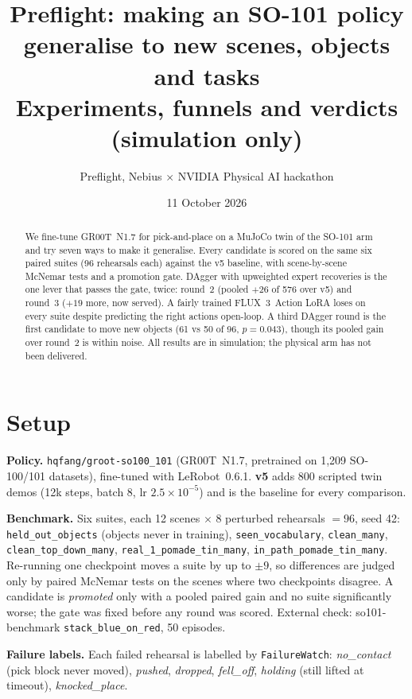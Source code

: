 \documentclass[10pt]{article}
\title{Preflight: making an SO-101 policy generalise to new scenes, objects and tasks\\
\large Experiments, funnels and verdicts (simulation only)}
\author{Preflight, Nebius $\times$ NVIDIA Physical AI hackathon}
\date{11 October 2026}
\begin{document}
\maketitle

\begin{abstract}
We fine-tune GR00T~N1.7 for pick-and-place on a MuJoCo twin of the SO-101 arm and try seven ways to make it
generalise. Every candidate is scored on the same six paired suites (96 rehearsals each) against the v5 baseline, with
scene-by-scene McNemar tests and a promotion gate. DAgger with upweighted expert recoveries is the one lever that passes the gate, twice: round~2 (pooled $+26$ of 576 over v5) and round~3 ($+19$ more, now served). A fairly trained FLUX~3~Action LoRA
loses on every suite despite predicting the right actions open-loop. A third DAgger round is the first candidate to move
new objects (61 vs 50 of 96, $p=0.043$), though its pooled gain over round~2 is within noise. All results are in simulation; the physical arm has not been delivered.
\end{abstract}

\section{Setup}
\textbf{Policy.} \texttt{hqfang/groot-so100\_101} (GR00T~N1.7, pretrained on 1,209 SO-100/101 datasets), fine-tuned with
LeRobot~0.6.1. \textbf{v5} adds 800 scripted twin demos (12k steps, batch 8, lr $2.5\times10^{-5}$) and is the
baseline for every comparison.

\textbf{Benchmark.} Six suites, each 12 scenes $\times$ 8 perturbed rehearsals $=96$, seed 42:
\texttt{held\_out\_objects} (objects never in training), \texttt{seen\_vocabulary}, \texttt{clean\_many},
\texttt{clean\_top\_down\_many}, \texttt{real\_1\_pomade\_tin\_many}, \texttt{in\_path\_pomade\_tin\_many}. Re-running one
checkpoint moves a suite by up to $\pm9$, so differences are judged only by paired McNemar tests on the scenes where two
checkpoints disagree. A candidate is \emph{promoted} only with a pooled paired gain and no suite significantly worse; the
gate was fixed before any round was scored. External check: so101-benchmark \texttt{stack\_blue\_on\_red}, 50 episodes.

\textbf{Failure labels.} Each failed rehearsal is labelled by \texttt{FailureWatch}: \emph{no\_contact} (pick block never
moved), \emph{pushed}, \emph{dropped}, \emph{fell\_off}, \emph{holding} (still lifted at timeout), \emph{knocked\_place}.
\end{document}
